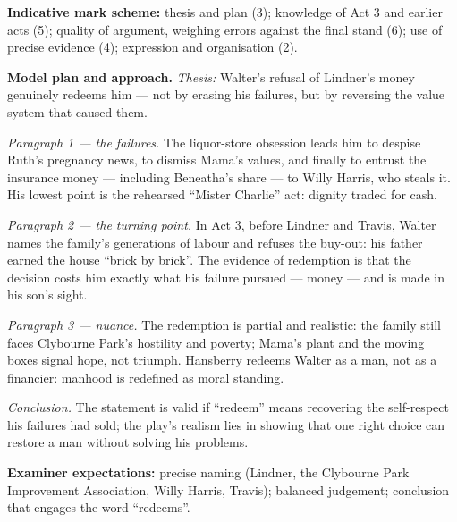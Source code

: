 \documentclass[11pt]{article}
\begin{document}
\begin{corrige}
\textbf{Indicative mark scheme:} thesis and plan (3); knowledge of Act 3 and earlier acts (5); quality of argument, weighing errors against the final stand (6); use of precise evidence (4); expression and organisation (2).

\textbf{Model plan and approach.}
\emph{Thesis:} Walter's refusal of Lindner's money genuinely redeems him --- not by erasing his failures, but by reversing the value system that caused them.

\emph{Paragraph 1 --- the failures.} The liquor-store obsession leads him to despise Ruth's pregnancy news, to dismiss Mama's values, and finally to entrust the insurance money --- including Beneatha's share --- to Willy Harris, who steals it. His lowest point is the rehearsed ``Mister Charlie'' act: dignity traded for cash.

\emph{Paragraph 2 --- the turning point.} In Act 3, before Lindner and Travis, Walter names the family's generations of labour and refuses the buy-out: his father earned the house ``brick by brick''. The evidence of redemption is that the decision costs him exactly what his failure pursued --- money --- and is made in his son's sight.

\emph{Paragraph 3 --- nuance.} The redemption is partial and realistic: the family still faces Clybourne Park's hostility and poverty; Mama's plant and the moving boxes signal hope, not triumph. Hansberry redeems Walter as a man, not as a financier: manhood is redefined as moral standing.

\emph{Conclusion.} The statement is valid if ``redeem'' means recovering the self-respect his failures had sold; the play's realism lies in showing that one right choice can restore a man without solving his problems.

\textbf{Examiner expectations:} precise naming (Lindner, the Clybourne Park Improvement Association, Willy Harris, Travis); balanced judgement; conclusion that engages the word ``redeems''.
\end{corrige}
\end{document}
